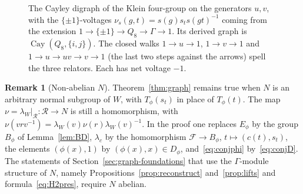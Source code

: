 \documentclass[12pt,letterpaper]{article}
\numberwithin{equation}{section}
\theoremstyle{plain}
\theoremstyle{definition}
\newtheorem{remark}[theorem]{Remark}
\newcommand{\fr}{\mathcal{F}}             %
\newcommand{\rel}{\mathcal{R}}            %
\DeclareMathOperator{\Cay}{Cay}
\begin{document}
\begin{figure}[ht]
\centering
{}
\caption{The Cayley digraph of the Klein four-group on the generators
$u,v$, with the $\{\pm1\}$-voltages $\nu_s(g,t)=s(g)s_ts(gt)^{-1}$ coming
from the extension $1\to\{\pm1\}\to Q_8\to\Gamma\to1$. Its derived graph
is $\Cay(Q_8,\{i,j\})$. The closed walks $1\to u\to1$, $1\to v\to1$ and
$1\to u\to uv\to v\to1$ (the last two steps against the arrows) spell the
three relators. Each has net voltage $-1$.}\label{fig:klein}
\end{figure}

\begin{remark}[Non-abelian $N$]\label{rem:graph-nonab}
Theorem~\ref{thm:graph} remains true when $N$ is an arbitrary normal
subgroup of $W$, with $T_\phi(s_t)$ in place of $T_\phi(t)$. The map
$\nu=\lambda_W|_{\rel}:\rel\to N$ is still a homomorphism, with
$\nu(vrv^{-1})=\lambda_W(v)\nu(r)\lambda_W(v)^{-1}$. In the proof one
replaces $E_\phi$ by the group $B_\phi$ of Lemma~\ref{lem:BD},
$\lambda_c$ by the homomorphism $\fr\to B_\phi$, $t\mapsto(c(t),s_t)$, the
elements $(\phi(x),1)$ by $(\phi(x),x)\in D_\phi$, and~\eqref{eq:conjphi}
by~\eqref{eq:conjD}. The statements of Section~\ref{sec:graph-foundations} that use the
$\Gamma$-module structure of $N$, namely
Propositions~\ref{prop:reconstruct} and~\ref{prop:lifts}
and formula~\eqref{eq:H2pres}, require $N$ abelian.
\end{remark}
\end{document}

